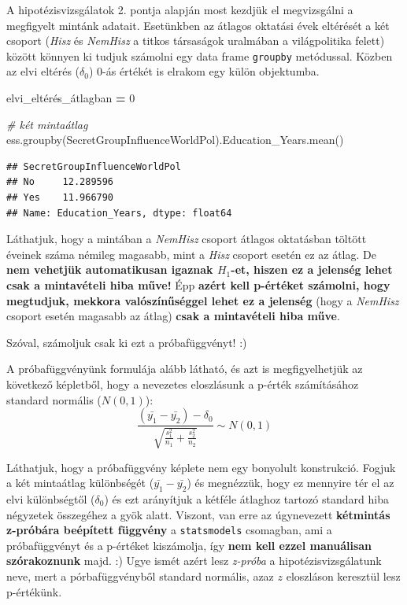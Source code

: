 \documentclass[
]{book}
\newenvironment{Shaded}{\begin{snugshade}}{\end{snugshade}}
\newcommand{\CommentTok}[1]{\textcolor[rgb]{0.56,0.35,0.01}{\textit{#1}}}
\newcommand{\DecValTok}[1]{\textcolor[rgb]{0.00,0.00,0.81}{#1}}
\newcommand{\NormalTok}[1]{#1}
\newcommand{\OperatorTok}[1]{\textcolor[rgb]{0.81,0.36,0.00}{\textbf{#1}}}
\newcommand{\StringTok}[1]{\textcolor[rgb]{0.31,0.60,0.02}{#1}}
\begin{document}
A hipotézisvizsgálatok 2. pontja alapján most kezdjük el megvizsgálni a megfigyelt mintánk adatait. Esetünkben az átlagos oktatási évek eltérését a két csoport (\emph{Hisz} és \emph{NemHisz} a titkos társaságok uralmában a világpolitika felett) között könnyen ki tudjuk számolni egy data frame \texttt{groupby} metódussal. Közben az elvi eltérés (\(\delta_0\)) \(0\)-ás értékét is elrakom egy külön objektumba.

\begin{Shaded}
\begin{Highlighting}[]
\NormalTok{elvi\_eltérés\_átlagban }\OperatorTok{=} \DecValTok{0}

\CommentTok{\# két mintaátlag}
\NormalTok{ess.groupby(}\StringTok{\textquotesingle{}SecretGroupInfluenceWorldPol\textquotesingle{}}\NormalTok{).Education\_Years.mean()}
\end{Highlighting}
\end{Shaded}

\begin{verbatim}
## SecretGroupInfluenceWorldPol
## No     12.289596
## Yes    11.966790
## Name: Education_Years, dtype: float64
\end{verbatim}

Láthatjuk, hogy a mintában a \emph{NemHisz} csoport átlagos oktatásban töltött éveinek száma némileg magasabb, mint a \emph{Hisz} csoport esetén ez az átlag. De \textbf{nem vehetjük automatikusan igaznak \(H_1\)-et, hiszen ez a jelenség lehet csak a mintavételi hiba műve!} Épp \textbf{azért kell p-értéket számolni, hogy megtudjuk, mekkora valószínűséggel lehet ez a jelenség} (hogy a \emph{NemHisz} csoport esetén magasabb az átlag) \textbf{csak a mintavételi hiba műve}.

Szóval, számoljuk csak ki ezt a próbafüggvényt! :)

A próbafüggvényünk formulája alább látható, és azt is megfigyelhetjük az következő képletből, hogy a nevezetes eloszlásunk a p-érték számításához standard normális (\(N(0,1)\)): \[\frac{(\bar{y_1}-\bar{y_2})-\delta_0}{\sqrt{\frac{s_1^2}{n_1}+\frac{s_2^2}{n_2}}} \sim N(0,1)\]

Láthatjuk, hogy a próbafüggvény képlete nem egy bonyolult konstrukció. Fogjuk a két mintaátlag különbségét (\(\bar{y_1}-\bar{y_2}\)) és megnézzük, hogy ez mennyire tér el az elvi különbségtől (\(\delta_0\)) és ezt arányítjuk a kétféle átlaghoz tartozó standard hiba négyzetek összegéhez a gyök alatt. Viszont, van erre az úgynevezett \textbf{kétmintás z-próbára beépített függvény} a \texttt{statsmodels} csomagban, ami a próbafüggvényt és a p-értéket kiszámolja, így \textbf{nem kell ezzel manuálisan szórakoznunk} majd. :)
Ugye ismét azért lesz \emph{z-próba} a hipotézisvizsgálatunk neve, mert a pórbafüggvényből standard normális, azaz \(z\) eloszláson keresztül lesz p-értékünk.
\end{document}
